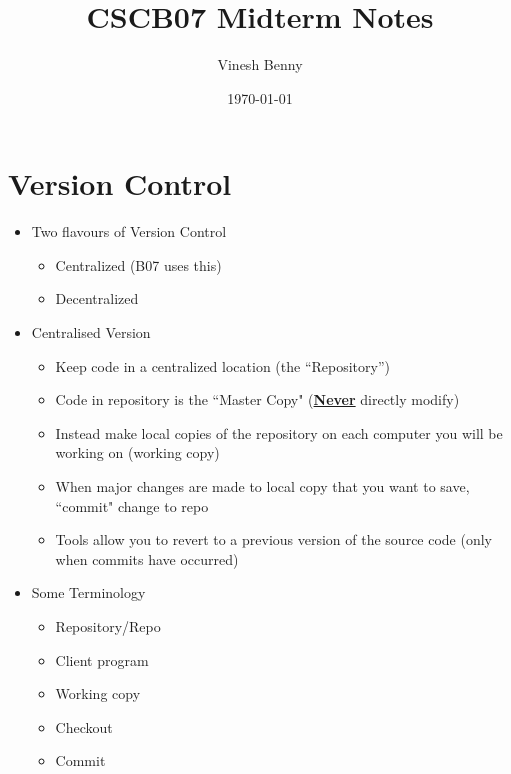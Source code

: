 \documentclass[11pt]{article}
\title{CSCB07 Midterm Notes}
\author{Vinesh Benny}
\date{\today}
\begin{document}

\section{Version Control}

\begin{itemize}
	\item Two flavours of Version Control
		\begin{itemize}
			\item Centralized (B07 uses this)
			\item Decentralized
		\end{itemize}

	\item Centralised Version
		\begin{itemize}
			\item Keep code in a centralized location (the “Repository”)
			\item Code in repository is the ``Master Copy" (\textbf{\underline{Never}} directly modify)
			\item Instead make local copies of the repository on each computer you will be working on (working copy)
			\item When major changes are made to local copy that you want to save, ``commit" change to repo
			\item Tools allow you to revert to a previous version of the source code (only when commits have occurred)
		\end{itemize}

	\item Some Terminology

		\begin{minipage}[t][0.72in]{0.25\textwidth}
			\begin{itemize}
				\item Repository/Repo
				\item Client program
				\item Working copy
			\end{itemize}
		\end{minipage}
		\begin{minipage}[t]{0.4\textwidth}
			\begin{itemize}
				\item Checkout
				\item Commit
			\end{itemize}
		\end{minipage}



\end{itemize}
\end{document}
